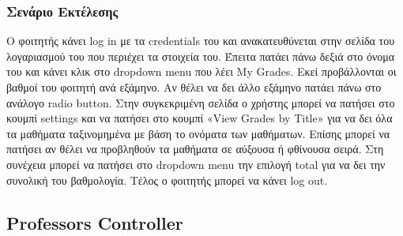 \documentclass[12pt]{article}
\begin{document}
\subsubsection{Σενάριο Εκτέλεσης}
Ο φοιτητής κάνει log in με τα credentials του και ανακατευθύνεται στην σελίδα του λογαριασμού του που περιέχει τα στοιχεία του. Έπειτα πατάει πάνω δεξιά στο όνομα του και κάνει κλικ στο  dropdown menu που λέει My Grades. Εκεί προβάλλονται οι βαθμοί του φοιτητή ανά εξάμηνο.  Αν θέλει να δει άλλο εξάμηνο πατάει πάνω στο ανάλογο radio button. Στην συγκεκριμένη σελίδα ο χρήστης μπορεί να πατήσει στο κουμπί settings και να πατήσει στο κουμπί «View Grades by Title» για να δει όλα τα μαθήματα ταξινομημένα με βάση το ονόματα των μαθήματων. Επίσης μπορεί να πατήσει αν θέλει να προβληθούν τα μαθήματα σε αύξουσα ή φθίνουσα σειρά. Στη συνέχεια μπορεί να πατήσει στο dropdown menu την επιλογή total για να δει την συνολική του βαθμολογία. Τέλος ο φοιτητής μπορεί να κάνει log out.
	
\subsection{Professors Controller}
\end{document}
